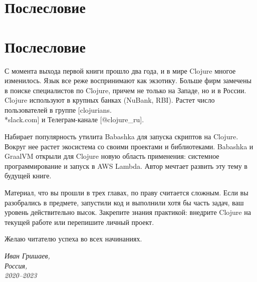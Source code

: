 
\ifprint
\chapter{Послесловие}
\else
\chapter*{Послесловие}
\fi

С момента выхода первой книги прошло два года, и в мире Clojure многое
изменилось. Язык все реже воспринимают как экзотику. Больше фирм замечены в
поиске специалистов по Clojure, причем не только на Западе, но и в России. Clojure
используют в крупных банках (NuBank, RBI). Растет число пользователей в группе
[clojurians.\\*slack.com]
и Телеграм-канале [@clo\-ju\-re\_ru].



Набирает популярность утилита Babashka для запуска скриптов на Clojure. Вокруг
нее растет экосистема со своими проектами и библиотеками. Babashka и GraalVM
открыли для Clojure новую область применения: системное программирование и
запуск в AWS Lambda. Автор мечтает развить эту тему в будущей книге.


Материал, что вы прошли в трех главах, по праву считается сложным. Если вы
разобрались в предмете, запустили код и выполнили хотя бы часть задач, ваш
уровень действительно высок. Закрепите знания практикой: внедрите Clojure на
текущей работе или перепишите личный проект.

Желаю читателю успеха во всех начинаниях.

\vspace{1em}

\noindent

\hspace{\fill}\parbox{4cm}{\textit{Иван Гришаев,\\Россия,\\2020--2023}}
